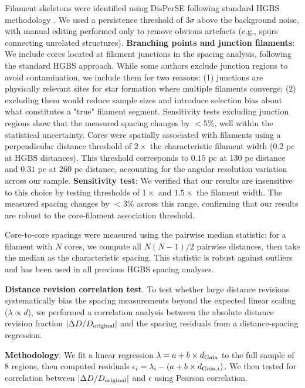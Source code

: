 \documentclass[twoside,twocolumn]{mnras}
\begin{document}
Filament skeletons were identified using DisPerSE \citep{Sousbie2011} following standard HGBS methodology \citep{Arzoumanian2011}. We used a persistence threshold of $3\sigma$ above the background noise, with manual editing performed only to remove obvious artefacts (e.g., spurs connecting unrelated structures). \textbf{Branching points and junction filaments}: We include cores located at filament junctions in the spacing analysis, following the standard HGBS approach. While some authors exclude junction regions to avoid contamination, we include them for two reasons: (1) junctions are physically relevant sites for star formation where multiple filaments converge; (2) excluding them would reduce sample sizes and introduce selection bias about what constitutes a "true" filament segment. Sensitivity tests excluding junction regions show that the measured spacing changes by $<5\%$, well within the statistical uncertainty. Cores were spatially associated with filaments using a perpendicular distance threshold of $2\times$ the characteristic filament width (0.2 pc at HGBS distances). This threshold corresponds to $0.15$ pc at 130 pc distance and $0.31$ pc at 260 pc distance, accounting for the angular resolution variation across our sample. \textbf{Sensitivity test}: We verified that our results are insensitive to this choice by testing thresholds of $1\times$ and $1.5\times$ the filament width. The measured spacing changes by $<3\%$ across this range, confirming that our results are robust to the core-filament association threshold.

Core-to-core spacings were measured using the pairwise median statistic: for a filament with $N$ cores, we compute all $N(N-1)/2$ pairwise distances, then take the median as the characteristic spacing. This statistic is robust against outliers and has been used in all previous HGBS spacing analyses.

\textbf{Distance revision correlation test}. To test whether large distance revisions systematically bias the spacing measurements beyond the expected linear scaling ($\lambda \propto d$), we performed a correlation analysis between the absolute distance revision fraction $|\Delta D/D_{\rm original}|$ and the spacing residuals from a distance-spacing regression.

\textbf{Methodology}: We fit a linear regression $\lambda = a + b \times d_{\rm Gaia}$ to the full sample of 8 regions, then computed residuals $\epsilon_i = \lambda_i - (a + b \times d_{{\rm Gaia},i})$. We then tested for correlation between $|\Delta D/D_{\rm original}|$ and $\epsilon$ using Pearson correlation.
\end{document}
